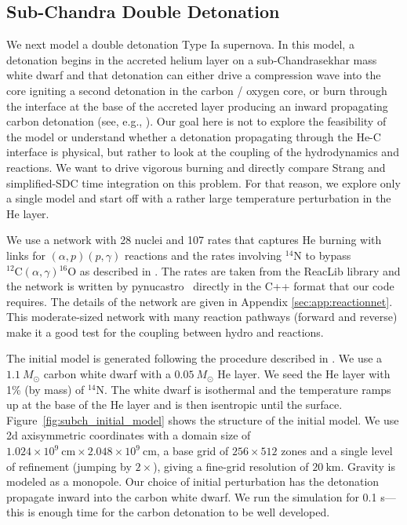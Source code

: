 \documentclass[times,preprint]{aastex631}
\newcommand{\pynucastro}{{\sf pynucastro}}
\newcommand{\isot}[2]{$^{#2}\mathrm{#1}$}
\newcommand{\isotm}[2]{{}^{#2}\mathrm{#1}}
\begin{document}
\subsection{Sub-Chandra Double Detonation}
\label{sec:dd}

We next model a double detonation Type Ia supernova.  In this model, a
detonation begins in the accreted helium layer on a sub-Chandrasekhar mass white
dwarf and that detonation can either drive a compression wave into the core
igniting a second detonation in the carbon / oxygen core, or burn through the
interface at the base of the accreted layer producing an inward propagating
carbon detonation (see, e.g., \citealt{fink:2007}).  Our goal here is not to
explore the feasibility of the model or understand whether a detonation
propagating through the He-C interface is physical, but rather to look at the
coupling of the hydrodynamics and reactions.  We want to drive vigorous burning
and directly compare Strang and simplified-SDC time integration on this problem.
For that reason, we explore only a single model and start off with a rather
large temperature perturbation in the He layer.

We use a network with 28 nuclei and 107 rates that captures He burning with
links for $(\alpha,p)(p,\gamma)$ reactions and the rates involving \isot{N}{14}
to bypass $\isotm{C}{12}(\alpha,\gamma)\isotm{O}{16}$ as described in
\cite{shenbildsten}.  The rates are taken from the ReacLib library
\citep{reaclib} and the network is written by \pynucastro~\citep{pynucastro}
directly in the C++ format that our code requires.  The details of the network
are given in Appendix \ref{sec:app:reactionnet}. This moderate-sized network
with many reaction pathways (forward and reverse) make it a good test for the
coupling between hydro and reactions.


The initial model is generated following the procedure described in
\citep{subchandra}.  We use a $1.1~M_\odot$ carbon white dwarf with a
$0.05~M_\odot$ He layer.  We seed the He layer with 1\% (by mass) of
\isot{N}{14}.  The white dwarf is isothermal and the temperature ramps
up at the base of the He layer and is then isentropic until the
surface.  Figure~\ref{fig:subch_initial_model} shows the structure of
the initial model.  We use 2d axisymmetric coordinates with a domain
size of $1.024\times 10^9~\mathrm{cm} \times 2.048\times
10^9~\mathrm{cm}$, a base grid of $256 \times 512$ zones and a single
level of refinement (jumping by $2\times$), giving a fine-grid
resolution of $20~\mathrm{km}$.  Gravity is modeled as a monopole.
Our choice of initial perturbation has the detonation propagate inward
into the carbon white dwarf.  We run the simulation for 0.1 s---this
is enough time for the carbon detonation to be well developed.
\end{document}
